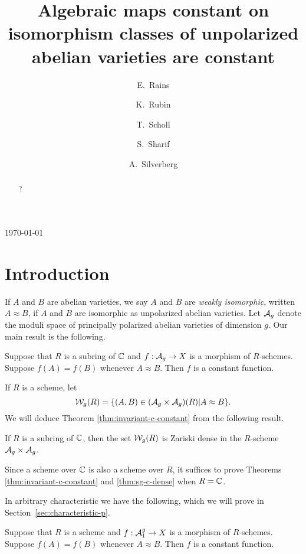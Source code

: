 \documentclass{amsart}
\title[Algebraic maps constant on unpolarized isomorphism classes]{Algebraic maps constant on isomorphism classes of unpolarized abelian varieties are constant}
\author[E.\ Rains]{E.\ Rains}
\author[K.\ Rubin]{K.\ Rubin}
\author[T.\ Scholl]{T.\ Scholl}
\author[S.\ Sharif]{S.\ Sharif}
\author[A.\ Silverberg]{A.\ Silverberg}
\begin{document}
\begin{abstract}
?
\end{abstract}


\today
\maketitle



\section{Introduction}
\label{sec:introduction}

If $A$ and $B$ are abelian varieties, we say $A$ and $B$ are \emph{weakly isomorphic}, written $A \approx B$, if $A$ and $B$ are isomorphic as unpolarized abelian varieties. Let $\mathcal{A}_g$ denote the moduli space of principally polarized abelian varieties of dimension $g$. Our main result is the following.
\begin{theorem}\label{thm:invariant-c-constant}
  Suppose that $R$ is a subring of $\mathbb{C}$ and $f: \mathcal{A}_g \to X$ is a morphism of $R$-schemes. Suppose $f(A) = f(B)$ whenever $A \approx B$. Then $f$ is a constant function.
\end{theorem}

If $R$ is a scheme, let
$$
\mathcal{W}_g(R) = \{(A,B) \in (\mathcal{A}_g \times \mathcal{A}_g)(R) | A \approx B\}.
$$
We will deduce Theorem \ref{thm:invariant-c-constant} from the following result.

\begin{theorem}\label{thm:sg-c-dense}
  If $R$ is a subring of $\mathbb{C}$, then the set $\mathcal{W}_g(R)$ is Zariski dense in the $R$-scheme $\mathcal{A}_g \times \mathcal{A}_g$.
\end{theorem}
Since a scheme over $\mathbb{C}$ is also a scheme over $R$, it suffices to prove Theorems \ref{thm:invariant-c-constant} and \ref{thm:sg-c-dense} when $R = \mathbb{C}$.

In arbitrary characteristic we have the following, which we will prove in Section~\ref{sec:characteristic-p}.
\begin{theorem}\label{thm:arbit-char}
  Suppose that $R$ is a scheme and $f: \mathcal{A}_1^g \to X$ is a morphism of $R$-schemes. Suppose $f(A) = f(B)$ whenever $A \approx B$. Then $f$ is a constant function.
\end{theorem}
\end{document}

